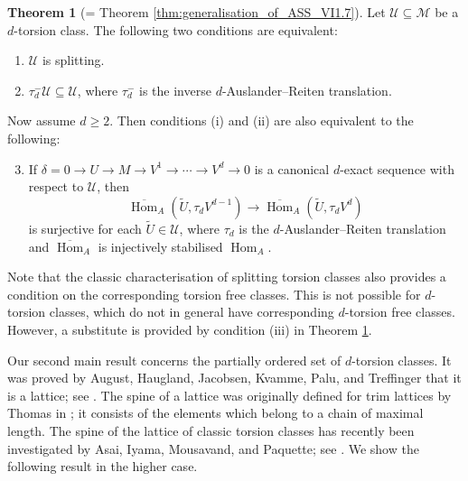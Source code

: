 \documentclass[12pt,reqno]{amsart}
\def\cM{\mathscr{M}}
\def\cU{\mathscr{U}}
\def\Hom{\operatorname{Hom}}
\numberwithin{equation}{section}
\theoremstyle{definition}
\theoremstyle{theorem}
\newtheorem{ThmIntro}{Theorem}
\theoremstyle{definition}
\begin{document}
\begin{ThmIntro}
[= Theorem \ref{thm:generalisation_of_ASS_VI1.7}]
\label{thm:A}
Let $\cU \subseteq \cM$ be a $d$-torsion class.  The following two conditions are equivalent:
\begin{enumerate}
\setlength\itemsep{4pt}

  \item  $\cU$ is splitting.
  
  \item  $\tau_d^-\cU \subseteq \cU\!$, where $\tau_d^-$ is the inverse $d$-Auslander--Reiten translation. 

\end{enumerate}
Now assume $d \geqslant 2$.  Then conditions (i) and (ii) are also equivalent to the following:
\begin{enumerate}
\setcounter{enumi}{2}
\setlength\itemsep{4pt}

  \item  If $\delta = 0 \xrightarrow{} U \xrightarrow{} M \xrightarrow{} V^1 \xrightarrow{} \cdots \xrightarrow{} V^d \xrightarrow{} 0$ is a canonical $d$-exact sequence with respect to $\cU\!$, then
\[  
  \overline{ \Hom }_A( \widetilde{ U },\tau_dV^{ d-1 } ) \xrightarrow{} \overline{ \Hom }_A( \widetilde{ U },\tau_dV^{ d } )
\]  
is surjective for each $\widetilde{ U } \in \cU\!$, where $\tau_d$ is the $d$-Auslander--Reiten translation and $\overline{ \Hom }_A$ is injectively stabilised $\Hom_A$.  

\end{enumerate}
\end{ThmIntro}

Note that the classic characterisation of splitting torsion classes also provides a condition on the corresponding torsion free classes.  This is not possible for $d$-torsion classes, which do not in general have corresponding $d$-torsion free classes.  However, a substitute is provided by condition (iii) in Theorem \ref{thm:A}.

Our second main result concerns the partially ordered set of $d$-torsion classes.  It was proved by August, Haugland, Jacobsen, Kvamme, Palu, and Treffinger that it is a lattice; see \cite[thm.\ 4.3]{August-et-al_A-characterisation-of-higher-torsion-classes}.  The spine of a lattice was originally defined for trim lattices by Thomas in \cite[p.\ 257]{Thomas_An-analogue-of-distributivity-for-ungraded-lattices}; it consists of the elements which belong to a chain of maximal length.  The spine of the lattice of classic torsion classes has recently been investigated by Asai, Iyama, Mousavand, and Paquette; see \cite[thm.\ 1.7]{Asai-Iyama-Mousavand-Paquette_Brick-splitting-torsion-pairs-and-trim-lattices}.  We show the following result in the higher case.
\end{document}
